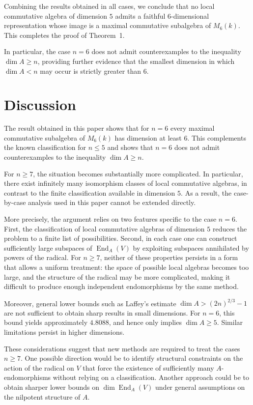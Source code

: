 \documentclass[11pt]{article}
\DeclareMathOperator{\End}{End}
\theoremstyle{plain}
\theoremstyle{remark}
\begin{document}
Combining the results obtained in all cases, we conclude that no local commutative algebra of dimension $5$ admits a faithful $6$-dimensional representation whose image is a maximal commutative subalgebra of $M_6(k)$. This completes the proof of Theorem~1.

In particular, the case $n=6$ does not admit counterexamples to the inequality $\dim A \ge n$, providing further evidence that the smallest dimension in which $\dim A < n$ may occur is strictly greater than $6$.




\section{Discussion}

The result obtained in this paper shows that for $n = 6$ every maximal commutative subalgebra of $M_6(k)$ has dimension at least $6$. This complements the known classification for $n \leq 5$ and shows that $n = 6$ does not admit counterexamples to the inequality $\dim A \geq n$.

For $n \geq 7$, the situation becomes substantially more complicated. In particular, there exist infinitely many isomorphism classes of local commutative algebras, in contrast to the finite classification available in dimension $5$. As a result, the case-by-case analysis used in this paper cannot be extended directly.

More precisely, the argument relies on two features specific to the case $n=6$. First, the classification of local commutative algebras of dimension $5$ reduces the problem to a finite list of possibilities. Second, in each case one can construct sufficiently large subspaces of $\End_A(V)$ by exploiting subspaces annihilated by powers of the radical. For $n \geq 7$, neither of these properties persists in a form that allows a uniform treatment: the space of possible local algebras becomes too large, and the structure of the radical may be more complicated, making it difficult to produce enough independent endomorphisms by the same method.

Moreover, general lower bounds such as Laffey’s estimate $\dim A > (2n)^{2/3} - 1$ are not sufficient to obtain sharp results in small dimensions. For $n = 6$, this bound yields approximately $4.8088$, and hence only implies $\dim A \geq 5$. Similar limitations persist in higher dimensions.

These considerations suggest that new methods are required to treat the cases $n \geq 7$. One possible direction would be to identify structural constraints on the action of the radical on $V$ that force the existence of sufficiently many $A$-endomorphisms without relying on a classification. Another approach could be to obtain sharper lower bounds on $\dim \End_A(V)$ under general assumptions on the nilpotent structure of $A$.
\end{document}
